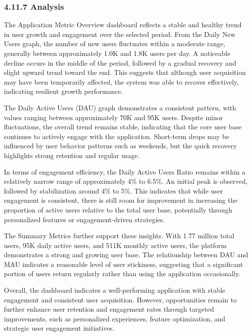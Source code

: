 \subsubsection{\texorpdfstring{\textbf{4.11.7
Analysis}}{4.11.7 Analysis}}\label{analysis}

The Application Metric Overview dashboard reflects a stable and healthy
trend in user growth and engagement over the selected period. From the
Daily New Users graph, the number of new users fluctuates within a
moderate range, generally between approximately 1.0K and 1.8K users per
day. A noticeable decline occurs in the middle of the period, followed
by a gradual recovery and slight upward trend toward the end. This
suggests that although user acquisition may have been temporarily
affected, the system was able to recover effectively, indicating
resilient growth performance.

The Daily Active Users (DAU) graph demonstrates a consistent pattern,
with values ranging between approximately 70K and 95K users. Despite
minor fluctuations, the overall trend remains stable, indicating that
the core user base continues to actively engage with the application.
Short-term drops may be influenced by user behavior patterns such as
weekends, but the quick recovery highlights strong retention and regular
usage.

In terms of engagement efficiency, the Daily Active Users Ratio remains
within a relatively narrow range of approximately 4\% to 6.5\%. An
initial peak is observed, followed by stabilization around 4\% to 5\%.
This indicates that while user engagement is consistent, there is still
room for improvement in increasing the proportion of active users
relative to the total user base, potentially through personalized
features or engagement-driven strategies.

The Summary Metrics further support these insights. With 1.77 million
total users, 95K daily active users, and 511K monthly active users, the
platform demonstrates a strong and growing user base. The relationship
between DAU and MAU indicates a reasonable level of user stickiness,
suggesting that a significant portion of users return regularly rather
than using the application occasionally.

Overall, the dashboard indicates a well-performing application with
stable engagement and consistent user acquisition. However,
opportunities remain to further enhance user retention and engagement
rates through targeted improvements, such as personalized experiences,
feature optimization, and strategic user engagement initiatives.

